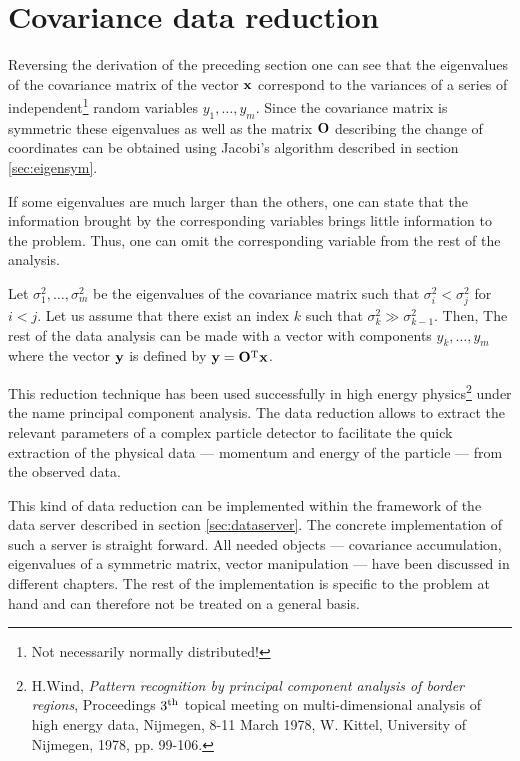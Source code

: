 \documentclass[twoside]{book}
\begin{document}
\section{Covariance data reduction}
\label{sec:datared} Reversing the derivation of the preceding
section one can see that the eigenvalues of the covariance matrix
of the vector ${\bf x}$ correspond to the variances of a series of
independent\footnote{Not necessarily normally distributed!} random
variables $y_1,\dots,y_m$. Since the covariance matrix is
symmetric these eigenvalues as well as the matrix ${\bf O}$
describing the change of coordinates can be obtained using
Jacobi's algorithm described in section \ref{sec:eigensym}.

If some eigenvalues are much larger than the others, one can state
that the information brought by the corresponding variables brings
little information to the problem. Thus, one can omit the
corresponding variable from the rest of the analysis.

Let $\sigma^2_1,\ldots,\sigma^2_m$ be the eigenvalues of the
covariance matrix such that $\sigma^2_i < \sigma^2_j$ for $i<j$.
Let us assume that there exist an index $k$ such that $\sigma^2_k
\gg \sigma^2_{k-1}$. Then,  The rest of the data analysis can be
made with a vector with components $y_k,\ldots,y_m$ where the
vector ${\bf y}$ is defined by ${\bf y}={\bf O}^{\mathop{\rm T}}{\bf x}$.

This reduction technique has been used successfully in high energy
physics\footnote{H.Wind, {\em Pattern recognition by principal
component analysis of border regions}, Proceedings $3^{\mathop{\rm
th}}$ topical meeting on multi-dimensional analysis of high energy
data, Nijmegen, 8-11 March 1978, W. Kittel, University of
Nijmegen, 1978, pp. 99-106.} under the name principal component
analysis. The data reduction allows to extract the relevant
parameters of a complex particle detector to facilitate the quick
extraction of the physical data --- momentum and energy of the
particle --- from the observed data.

This kind of data reduction can be implemented within the
framework of the data server described in section
\ref{sec:dataserver}. The concrete implementation of such a server
is straight forward. All needed objects --- covariance
accumulation, eigenvalues of a symmetric matrix, vector
manipulation --- have been discussed in different chapters. The
rest of the implementation is specific to the problem at hand and
can therefore not be treated on a general basis.
\end{document}
